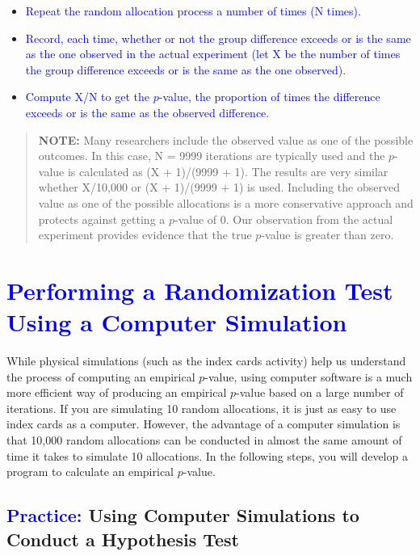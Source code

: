 \documentclass[
]{report}
\begin{document}
\begin{itemize}
\item \textcolor{blue}{Repeat the random allocation process a number of times (N times).}
\item \textcolor{blue}{Record, each time, whether or not the group difference exceeds or is the same as the one observed in the actual experiment (let X be the number of times the group difference exceeds or is the same as the one observed).}
\item \textcolor{blue}{Compute X/N to get the $\scriptstyle p$-value, the proportion of times the difference exceeds or is the same as the observed difference.}
\end{itemize}

\begin{quote}
\textbf{NOTE:} Many researchers include the observed value as one of the possible outcomes. In this case, N = 9999 iterations are typically used and the \(\scriptstyle p\)-value is calculated as (X + 1)/(9999 + 1). The results are very similar whether X/10,000 or (X + 1)/(9999 + 1) is used. Including the observed value as one of the possible allocations is a more conservative approach and protects against getting a \(\scriptstyle p\)-value of 0. Our observation from the actual experiment provides evidence that the true \(\scriptstyle p\)-value is greater than zero.
\end{quote}

\hypertarget{section-2}{%
\section{\texorpdfstring{\textcolor{blue}{ Performing a Randomization Test Using a Computer Simulation}}{}}\label{section-2}}

While physical simulations (such as the index cards activity) help us understand the process of computing an empirical \(\scriptstyle p\)-value, using computer software is a much more efficient way of producing an empirical \(\scriptstyle p\)-value based on a large number of iterations. If you are simulating 10 random allocations, it is just as easy to use index cards as a computer. However, the advantage of a computer simulation is that 10,000 random allocations can be conducted in almost the same amount of time it takes to simulate 10 allocations. In the following steps, you will develop a program to calculate an empirical \(\scriptstyle p\)-value.

\hypertarget{using-computer-simulations-to-conduct-a-hypothesis-test}{%
\subsection*{\texorpdfstring{\textcolor{blue}{Practice:} Using Computer Simulations to Conduct a Hypothesis Test}{ Using Computer Simulations to Conduct a Hypothesis Test}}\label{using-computer-simulations-to-conduct-a-hypothesis-test}}
\end{document}
